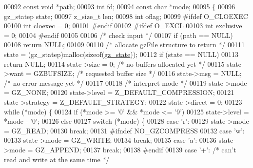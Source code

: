 \begin{DoxyCode}
{00092     \textcolor{keyword}{const} \textcolor{keywordtype}{void} *path;
00093     \textcolor{keywordtype}{int} fd;
00094     \textcolor{keyword}{const} \textcolor{keywordtype}{char} *mode;
00095 \{
00096     gz\_statep state;
00097     z\_size\_t len;
00098     \textcolor{keywordtype}{int} oflag;
00099 \textcolor{preprocessor}{#ifdef O\_CLOEXEC}
00100     \textcolor{keywordtype}{int} cloexec = 0;
00101 \textcolor{preprocessor}{#endif}
00102 \textcolor{preprocessor}{#ifdef O\_EXCL}
00103     \textcolor{keywordtype}{int} exclusive = 0;
00104 \textcolor{preprocessor}{#endif}
00105 
00106     \textcolor{comment}{/* check input */}
00107     \textcolor{keywordflow}{if} (path == NULL)
00108         \textcolor{keywordflow}{return} NULL;
00109 
00110     \textcolor{comment}{/* allocate gzFile structure to return */}
00111     state = (gz\_statep)malloc(\textcolor{keyword}{sizeof}(\hyperlink{structgz__state}{gz\_state}));
00112     \textcolor{keywordflow}{if} (state == NULL)
00113         \textcolor{keywordflow}{return} NULL;
00114     state->size = 0;            \textcolor{comment}{/* no buffers allocated yet */}
00115     state->want = GZBUFSIZE;    \textcolor{comment}{/* requested buffer size */}
00116     state->msg = NULL;          \textcolor{comment}{/* no error message yet */}
00117 
00118     \textcolor{comment}{/* interpret mode */}
00119     state->mode = GZ\_NONE;
00120     state->level = Z\_DEFAULT\_COMPRESSION;
00121     state->strategy = Z\_DEFAULT\_STRATEGY;
00122     state->direct = 0;
00123     \textcolor{keywordflow}{while} (*mode) \{
00124         \textcolor{keywordflow}{if} (*mode >= \textcolor{charliteral}{'0'} && *mode <= \textcolor{charliteral}{'9'})
00125             state->level = *mode - \textcolor{charliteral}{'0'};
00126         \textcolor{keywordflow}{else}
00127             \textcolor{keywordflow}{switch} (*mode) \{
00128             \textcolor{keywordflow}{case} \textcolor{charliteral}{'r'}:
00129                 state->mode = GZ\_READ;
00130                 \textcolor{keywordflow}{break};
00131 \textcolor{preprocessor}{#ifndef NO\_GZCOMPRESS}
00132             \textcolor{keywordflow}{case} \textcolor{charliteral}{'w'}:
00133                 state->mode = GZ\_WRITE;
00134                 \textcolor{keywordflow}{break};
00135             \textcolor{keywordflow}{case} \textcolor{charliteral}{'a'}:
00136                 state->mode = GZ\_APPEND;
00137                 \textcolor{keywordflow}{break};
00138 \textcolor{preprocessor}{#endif}
00139             \textcolor{keywordflow}{case} \textcolor{charliteral}{'+'}:       \textcolor{comment}{/* can't read and write at the same time */}
}
\end{DoxyCode}
